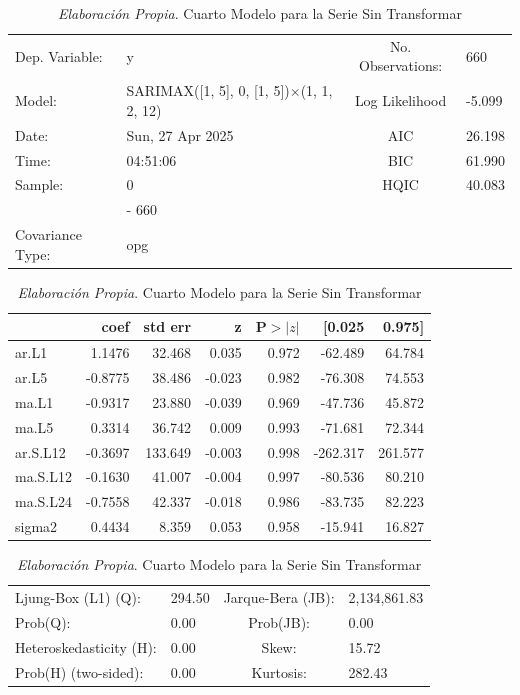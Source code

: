 \documentclass[12pt,letterpaper]{article}   %
\begin{document}
\begin{table}[htbp]
\centering
\tiny
\caption{\textit{Elaboración Propia}. Cuarto Modelo para la Serie Sin Transformar}
\begin{tabular}{llcl}
\toprule
Dep. Variable: & y & No. Observations: & 660 \\
Model: & SARIMAX([1, 5], 0, [1, 5])$\times$(1, 1, 2, 12) & Log Likelihood & -5.099 \\
Date: & Sun, 27 Apr 2025 & AIC & 26.198 \\
Time: & 04:51:06 & BIC & 61.990 \\
Sample: & 0 & HQIC & 40.083 \\
        & - 660 & & \\
Covariance Type: & opg & & \\
\bottomrule
\end{tabular}

\vspace{0.3cm}

\begin{tabular}{lrrrrrr}
\toprule
 & \textbf{coef} & \textbf{std err} & \textbf{z} & \textbf{P$>|z|$} & \textbf{[0.025} & \textbf{0.975]} \\
\midrule
ar.L1     & 1.1476  & 32.468  & 0.035  & 0.972 & -62.489 & 64.784 \\
ar.L5     & -0.8775 & 38.486  & -0.023 & 0.982 & -76.308 & 74.553 \\
ma.L1     & -0.9317 & 23.880  & -0.039 & 0.969 & -47.736 & 45.872 \\
ma.L5     & 0.3314  & 36.742  & 0.009  & 0.993 & -71.681 & 72.344 \\
ar.S.L12  & -0.3697 & 133.649 & -0.003 & 0.998 & -262.317 & 261.577 \\
ma.S.L12  & -0.1630 & 41.007  & -0.004 & 0.997 & -80.536 & 80.210 \\
ma.S.L24  & -0.7558 & 42.337  & -0.018 & 0.986 & -83.735 & 82.223 \\
sigma2    & 0.4434  & 8.359   & 0.053  & 0.958 & -15.941 & 16.827 \\
\bottomrule
\end{tabular}


\vspace{0.3cm}

\begin{tabular}{llcl}
\toprule
Ljung-Box (L1) (Q): & 294.50 & Jarque-Bera (JB): & 2,134,861.83 \\
Prob(Q): & 0.00 & Prob(JB): & 0.00 \\
Heteroskedasticity (H): & 0.00 & Skew: & 15.72 \\
Prob(H) (two-sided): & 0.00 & Kurtosis: & 282.43 \\
\bottomrule
\end{tabular}
\end{table}
\end{document}
